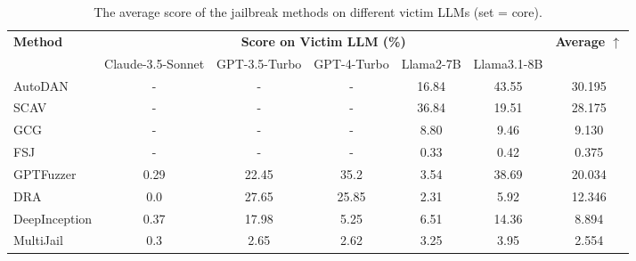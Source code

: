 
\begin{table*}[tp]
\centering
\caption{The average score of the jailbreak methods on different victim LLMs (set = core).}
\label{tab:core-leaderboard}
\begin{threeparttable}
\footnotesize
\renewcommand{\arraystretch}{1.2}
\setlength{\tabcolsep}{0.9\tabcolsep}
\setlength{\defaultaddspace}{0.7\defaultaddspace} %
\centering
\begin{tabular}{lccccc|c}
\toprule
\multirow{2}{*}{\textbf{Method}} & \multicolumn{5}{c|}{\textbf{Score on Victim LLM (\%)}} & \multirow{2}{*}{\textbf{Average $\uparrow$}} \\
 & {Claude-3.5-Sonnet} & {GPT-3.5-Turbo} & {GPT-4-Turbo} & {Llama2-7B} & {Llama3.1-8B} & \\
\midrule
AutoDAN & - & - & - & 16.84 & 43.55 & 30.195 \\
SCAV & - & - & - & 36.84 & 19.51 & 28.175 \\
GCG & - & - & - & 8.80 & 9.46 & 9.130 \\
FSJ & - & - & - & 0.33 & 0.42 & 0.375 \\
\midrule
GPTFuzzer & 0.29 & 22.45 & 35.2 & 3.54 & 38.69 & 20.034 \\
DRA & 0.0 & 27.65 & 25.85 & 2.31 & 5.92 & 12.346 \\
DeepInception & 0.37 & 17.98 & 5.25 & 6.51 & 14.36 & 8.894 \\
MultiJail & 0.3 & 2.65 & 2.62 & 3.25 & 3.95 & 2.554 \\
\bottomrule
\end{tabular}
\end{threeparttable}%
\end{table*}


